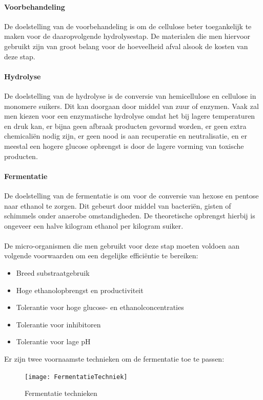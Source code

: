 \documentclass[a4paper,kul]{kulakarticle} %
\begin{document}
\paragraph{Voorbehandeling}
De doelstelling van de voorbehandeling is om de cellulose beter toegankelijk te maken voor de daaropvolgende hydrolysestap. De materialen die men hiervoor gebruikt zijn van groot belang voor de hoeveelheid afval alsook de kosten van deze stap.
\paragraph{Hydrolyse}
De doelstelling van de hydrolyse is de conversie van hemicellulose en cellulose in monomere suikers. Dit kan doorgaan door middel van zuur of enzymen. Vaak zal men kiezen voor een enzymatische hydrolyse omdat het bij lagere temperaturen en druk kan, er bijna geen afbraak producten gevormd worden, er geen extra chemicaliën nodig zijn, er geen nood is aan recuperatie en neutralisatie, en er meestal een hogere glucose opbrengst is door de lagere vorming van toxische producten. 
\paragraph{Fermentatie}
De doelstelling van de fermentatie is om voor de conversie van hexose en pentose naar ethanol te zorgen. Dit gebeurt door middel van bacteriën, gisten of schimmels onder anaerobe omstandigheden. De theoretische opbrengst hierbij is ongeveer een halve kilogram ethanol per kilogram suiker.\\
\\
De micro-organismen die men gebruikt voor deze stap moeten voldoen aan volgende voorwaarden om een degelijke efficiëntie te bereiken:
\begin{itemize}
	\item Breed substraatgebruik
	\item Hoge ethanolopbrengst en productiviteit
	\item Tolerantie voor hoge glucose- en ethanolconcentraties
	\item Tolerantie voor inhibitoren
	\item Tolerantie voor lage pH
\end{itemize}
Er zijn twee voornaamste technieken om de fermentatie toe te passen:
\begin{figure}[h]
	\centering
	\texttt{[image: FermentatieTechniek]}
	\caption[Fermentatie technieken]{Fermentatie technieken}
	\label{fig:fermentatietechniek}
\end{figure}
\end{document}
